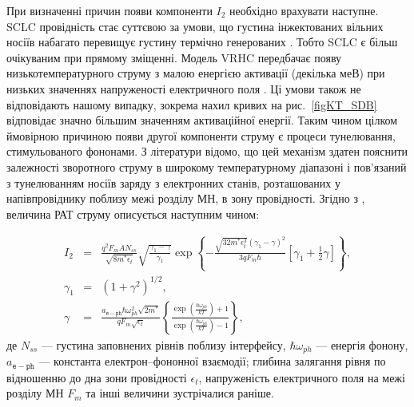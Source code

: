 При визначенні причин появи компоненти $I_2$ необхідно врахувати наступне.
SCLC провідність стає суттєвою за умови, що густина інжектованих вільних носіїв
набагато перевищує густину термічно генерованих \cite{Jafar}.
Тобто SCLC є більш очікуваним при прямому зміщенні.
Модель VRHC передбачає появу низькотемпературного струму з малою енергією активації (декілька меВ) при
низьких значеннях напруженості електричного поля \cite{Jafar}.
Ці умови також не відповідають нашому випадку, зокрема нахил кривих на рис.~\ref{figKT_SDB} відповідає значно більшим значенням
активаційної енергії.
Таким чином цілком ймовірною причиною появи другої компоненти струму є процеси тунелювання, стимульованого фононами.
З літератури \cite{Pipinys1999,Pipinys2006,PipinsFTP} відомо, що цей механізм здатен пояснити залежності
зворотного струму в широкому температурному діапазоні і пов'язаний з тунелюванням
 носіїв заряду з електронних станів, розташованих у напівпровіднику поблизу межі розділу МН, в зону провідності.
Згідно з \cite{Pipinys2006,Kiveris}, величина РАТ струму описується наступним чином:

\begin{eqnarray}
\label{eqIpat}
 I_{2}&=&\frac{q^2F_mAN_{ss}}{\sqrt{8m^*\epsilon_t}}\sqrt{\frac{\gamma_1-\gamma}{\gamma_1}}\exp
    \left\{-\frac{\sqrt{32m^*\epsilon_t^3}\left(\gamma_1-\gamma\right)^2}{3qF_m\hbar}
    [\gamma_1+\frac{1}{2}\gamma]\right\}, \\
    \gamma_1&=&(1+\gamma^2)^{1/2},\\
\label{eqIpat3}
    \gamma&=&\frac{a_\mathtt{e-ph}\hbar\omega_{ph}^2\sqrt{2m^*}}{qF_m\sqrt{\epsilon_t}}
    \left\{\frac{\exp\left(\frac{\hbar\omega_{ph}}{kT}\right)+1}{\exp\left(\frac{\hbar\omega_{ph}}{kT}\right)-1}\right\},
\end{eqnarray}
де
$N_{ss}$ --- густина заповнених рівнів поблизу інтерфейсу,
$\hbar\omega_{ph}$ --- енергія фонону,
$a_\mathtt{e-ph}$ --- константа електрон--фононної взаємодії;
глибина залягання рівня по відношенню до дна зони провідності $\epsilon_t$,
напруженість електричного поля на межі розділу МН $F_m$ та інші величини зустрічалися раніше.

